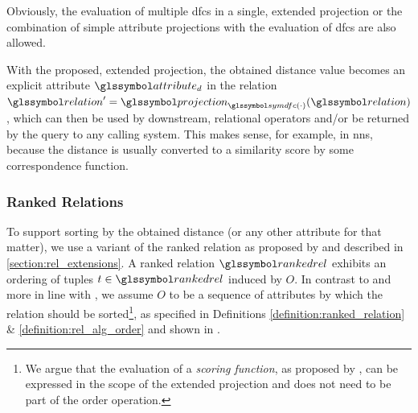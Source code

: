 Obviously, the evaluation of multiple \acrshort{dfc}s in a single, extended projection or the combination of simple attribute projections with the evaluation of \acrshort{dfc}s are also allowed.

With the proposed, extended projection, the obtained distance value becomes an explicit attribute $\attribute_d$ in the relation $ \relation^{\prime} = \projection_{\symdfc(\cdot)}(\relation)$, which can then be used by downstream, relational operators and/or be returned by the query to any calling system. This makes sense, for example, in \acrshort{nns}, because the distance is usually converted to a similarity score by some correspondence function.

\subsubsection{Ranked Relations}

To support sorting by the obtained distance (or any other attribute for that matter), we use a variant of the ranked relation as proposed by \cite{Chengkai:2005RankSQL} and described in \cref{section:rel_extensions}. A ranked relation $\rankedrel$ exhibits an ordering of tuples $t \in \rankedrel$ induced by $O$. In contrast to \cite{Chengkai:2005RankSQL} and more in line with \cite{Garcia:2009Database}, we assume $O$ to be a sequence of attributes by which the relation should be sorted\footnote{We argue that the evaluation of a \emph{scoring function}, as proposed by \cite{Chengkai:2005RankSQL}, can be expressed in the scope of the extended projection and does not need to be part of the order operation.}, as specified in Definitions \ref{definition:ranked_relation} \& \ref{definition:rel_alg_order} and shown in  .

